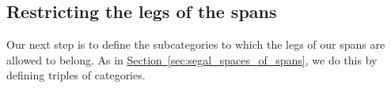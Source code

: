 \documentclass[main.tex]{subfiles}
\begin{document}
\subsection{Restricting the legs of the spans}
\label{ssc:restricting_the_legs_of_the_spans}

Our next step is to define the subcategories to which the legs of our spans are allowed to belong. As in \hyperref[sec:segal_spaces_of_spans]{Section~\ref*{sec:segal_spaces_of_spans}}, we do this by defining triples of categories.

\end{document}

